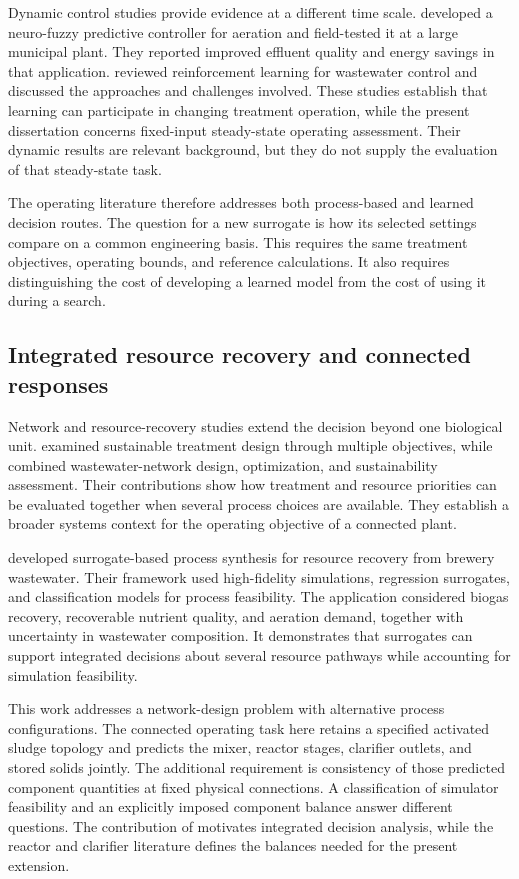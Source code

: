 Dynamic control studies provide evidence at a different time scale. \citet{Bernardelli2020} developed a neuro-fuzzy predictive controller for aeration and field-tested it at a large municipal plant. They reported improved effluent quality and energy savings in that application. \citet{Croll2023} reviewed reinforcement learning for wastewater control and discussed the approaches and challenges involved. These studies establish that learning can participate in changing treatment operation, while the present dissertation concerns fixed-input steady-state operating assessment. Their dynamic results are relevant background, but they do not supply the evaluation of that steady-state task.

The operating literature therefore addresses both process-based and learned decision routes. The question for a new surrogate is how its selected settings compare on a common engineering basis. This requires the same treatment objectives, operating bounds, and reference calculations. It also requires distinguishing the cost of developing a learned model from the cost of using it during a search.

\subsection{Integrated resource recovery and connected responses}

Network and resource-recovery studies extend the decision beyond one biological unit. \citet{PadronPaez2020} examined sustainable treatment design through multiple objectives, while \citet{Aboagye2021} combined wastewater-network design, optimization, and sustainability assessment. Their contributions show how treatment and resource priorities can be evaluated together when several process choices are available. They establish a broader systems context for the operating objective of a connected plant.

\citet{Durkin2024} developed surrogate-based process synthesis for resource recovery from brewery wastewater. Their framework used high-fidelity simulations, regression surrogates, and classification models for process feasibility. The application considered biogas recovery, recoverable nutrient quality, and aeration demand, together with uncertainty in wastewater composition. It demonstrates that surrogates can support integrated decisions about several resource pathways while accounting for simulation feasibility.

This work addresses a network-design problem with alternative process configurations. The connected operating task here retains a specified activated sludge topology and predicts the mixer, reactor stages, clarifier outlets, and stored solids jointly. The additional requirement is consistency of those predicted component quantities at fixed physical connections. A classification of simulator feasibility and an explicitly imposed component balance answer different questions. The contribution of \citet{Durkin2024} motivates integrated decision analysis, while the reactor and clarifier literature defines the balances needed for the present extension.

